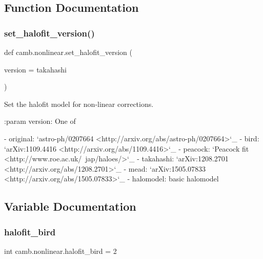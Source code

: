 \subsection{Function Documentation}
\mbox{\label{namespacecamb_1_1nonlinear_a01c70f88079f6593becfaa39b9fa3d2c}} 
\subsubsection{\texorpdfstring{set\+\_\+halofit\+\_\+version()}{set\_halofit\_version()}}
{\footnotesize\ttfamily def camb.\+nonlinear.\+set\+\_\+halofit\+\_\+version (\begin{DoxyParamCaption}\item[{}]{version = {\ttfamily \textquotesingle{}takahashi\textquotesingle{}} }\end{DoxyParamCaption})}

\begin{DoxyVerb}Set the halofit model for non-linear corrections.

:param version: One of

        - original: `astro-ph/0207664 <http://arxiv.org/abs/astro-ph/0207664>`_
        - bird: `arXiv:1109.4416 <http://arxiv.org/abs/1109.4416>`_
        - peacock: `Peacock fit <http://www.roe.ac.uk/~jap/haloes/>`_
        - takahashi: `arXiv:1208.2701 <http://arxiv.org/abs/1208.2701>`_
        - mead: `arXiv:1505.07833 <http://arxiv.org/abs/1505.07833>`_
        - halomodel: basic halomodel\end{DoxyVerb}
 

\subsection{Variable Documentation}
\mbox{\label{namespacecamb_1_1nonlinear_a2334ce8801e74e3271d92ea01c502564}} 
\subsubsection{\texorpdfstring{halofit\+\_\+bird}{halofit\_bird}}
{\footnotesize\ttfamily int camb.\+nonlinear.\+halofit\+\_\+bird = 2}

